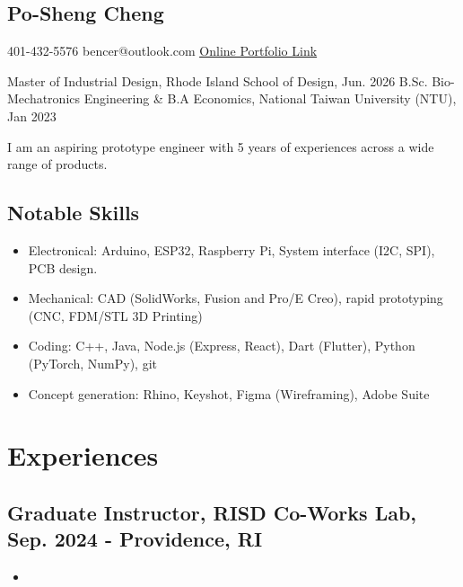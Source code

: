 \documentclass[12pt]{article}
\begin{document}
\begin{multicols}{2}
    \section*{Po-Sheng Cheng}
    401-432-5576 \newline
    bencer@outlook.com \newline
    \href{https://bencer3283.github.io/art/}{\underline{Online Portfolio Link}}
    
    \columnbreak
    {\sffamily \small \noindent
    Master of Industrial Design, Rhode Island School of Design, Jun. 2026 \newline
    B.Sc. Bio-Mechatronics Engineering \& \newline B.A Economics, National Taiwan University (NTU), Jan 2023
    }
\end{multicols}
{\small \noindent I am an aspiring prototype engineer with 5 years of experiences across a wide range of products.}
\subsection*{Notable Skills}
{ \small \begin{itemize}
    \item Electronical: Arduino, ESP32, Raspberry Pi, System interface (I2C, SPI), PCB design.
    \item Mechanical: CAD (SolidWorks, Fusion and Pro/E Creo), rapid prototyping (CNC, FDM/STL 3D Printing)
    \item Coding: C++, Java, Node.js (Express, React), Dart (Flutter), Python (PyTorch, NumPy), git
    \item Concept generation: Rhino, Keyshot, Figma (Wireframing), Adobe Suite
\end{itemize}}
    \section*{Experiences}
    \subsection*{Graduate Instructor, RISD Co-Works Lab, Sep. 2024 -  \hfill Providence, RI}
        {\sffamily
        \begin{itemize}
            \item 
        \end{itemize}
        }
\end{document}
